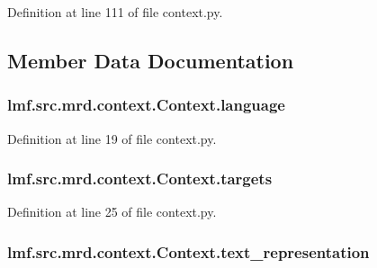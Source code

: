 Definition at line 111 of file context.\+py.



\subsection{Member Data Documentation}
\hypertarget{classlmf_1_1src_1_1mrd_1_1context_1_1_context_a4bbfb55e0df3e37ee91abbfc59fa4111}{
\subsubsection[{language}]{\setlength{\rightskip}{0pt plus 5cm}lmf.\+src.\+mrd.\+context.\+Context.\+language}}\label{classlmf_1_1src_1_1mrd_1_1context_1_1_context_a4bbfb55e0df3e37ee91abbfc59fa4111}


Definition at line 19 of file context.\+py.

\hypertarget{classlmf_1_1src_1_1mrd_1_1context_1_1_context_a29412f9361cee534cfa7148320e0826f}{
\subsubsection[{targets}]{\setlength{\rightskip}{0pt plus 5cm}lmf.\+src.\+mrd.\+context.\+Context.\+targets}}\label{classlmf_1_1src_1_1mrd_1_1context_1_1_context_a29412f9361cee534cfa7148320e0826f}


Definition at line 25 of file context.\+py.

\hypertarget{classlmf_1_1src_1_1mrd_1_1context_1_1_context_a471cd19ef138a424df53621024979ba7}{
\subsubsection[{text\+\_\+representation}]{\setlength{\rightskip}{0pt plus 5cm}lmf.\+src.\+mrd.\+context.\+Context.\+text\+\_\+representation}}\label{classlmf_1_1src_1_1mrd_1_1context_1_1_context_a471cd19ef138a424df53621024979ba7}


